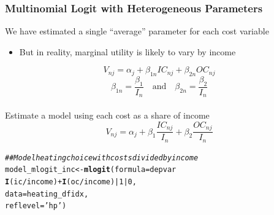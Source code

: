 \documentclass{beamer}\usepackage[]{graphicx}\usepackage[]{xcolor}
\makeatletter
\newcommand{\hlnum}[1]{\textcolor[rgb]{0.686,0.059,0.569}{#1}}%
\newcommand{\hlstr}[1]{\textcolor[rgb]{0.192,0.494,0.8}{#1}}%
\newcommand{\hlcom}[1]{\textcolor[rgb]{0.678,0.584,0.686}{\textit{#1}}}%
\newcommand{\hlopt}[1]{\textcolor[rgb]{0,0,0}{#1}}%
\newcommand{\hlstd}[1]{\textcolor[rgb]{0.345,0.345,0.345}{#1}}%
\newcommand{\hlkwb}[1]{\textcolor[rgb]{0.69,0.353,0.396}{#1}}%
\newcommand{\hlkwc}[1]{\textcolor[rgb]{0.333,0.667,0.333}{#1}}%
\newcommand{\hlkwd}[1]{\textcolor[rgb]{0.737,0.353,0.396}{\textbf{#1}}}%
\newenvironment{kframe}{%
 \def\at@end@of@kframe{}%
 \ifinner\ifhmode%
  \def\at@end@of@kframe{\end{minipage}}%
  \begin{minipage}{\columnwidth}%
 \fi\fi%
 \def\FrameCommand##1{\hskip\@totalleftmargin \hskip-\fboxsep
 \colorbox{shadecolor}{##1}\hskip-\fboxsep
     \hskip-\linewidth \hskip-\@totalleftmargin \hskip\columnwidth}%
 \MakeFramed {\advance\hsize-\width
   \@totalleftmargin\z@ \linewidth\hsize
   \@setminipage}}%
 {\par\unskip\endMakeFramed%
 \at@end@of@kframe}
\newenvironment{knitrout}{}{} %
\makeatother
\begin{document}
\begin{frame}[fragile]\frametitle{Multinomial Logit with Heterogeneous Parameters}
    We have estimated a single ``average'' parameter for each cost variable
    \begin{itemize}
        \item But in reality, marginal utility is likely to vary by income
    \end{itemize}
    $$V_{nj} = \alpha_j + \beta_{1n} IC_{nj} + \beta_{2n} OC_{nj}$$
    $$\beta_{1n} = \frac{\beta_1}{I_n} \quad \text{and} \quad \beta_{2n} = \frac{\beta_2}{I_n}$$ \\
    \vspace{2ex}
    Estimate a model using each cost as a share of income
    $$V_{nj} = \alpha_j + \beta_1 \frac{IC_{nj}}{I_n} + \beta_2 \frac{OC_{nj}}{I_n}$$
\begin{knitrout}\footnotesize
{}\color{fgcolor}\begin{kframe}
\begin{alltt}
\hlcom{## Model heating choice with costs divided by income}
\hlstd{model_mlogit_inc} \hlkwb{<-} \hlkwd{mlogit}\hlstd{(}\hlkwc{formula} \hlstd{= depvar} \hlopt{~}
                             \hlkwd{I}\hlstd{(ic} \hlopt{/} \hlstd{income)} \hlopt{+} \hlkwd{I}\hlstd{(oc} \hlopt{/} \hlstd{income)} \hlopt{|} \hlnum{1} \hlopt{|} \hlnum{0}\hlstd{,}
                           \hlkwc{data} \hlstd{= heating_dfidx,}
                           \hlkwc{reflevel} \hlstd{=} \hlstr{'hp'}\hlstd{)}
\end{alltt}
\end{kframe}
\end{knitrout}
\end{frame}
\end{document}
